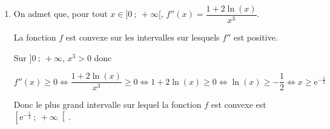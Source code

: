 \documentclass[10pt]{article}
\providecommand{\e}{{\mathrm{e}}}
\begin{document}
\begin{enumerate}
On dresse le tableau de variations de $f$ sur $]0~;~+\infty[$:

\begin{center}
{\renewcommand{\arraystretch}{1.3}
\def\esp{\hspace*{2.5cm}}
\def\hauteur{0pt}
$\begin{array}{|c|l *4{c}|}
\hline
x & 0  & \esp & \frac{1}{\e} & \esp & +\infty \\ 
\hline
f'(x) &\vline\;\vline  &   \pmb{+} & \vline\hspace{-2.7pt}0 & \pmb{-} & \\ 
\hline
 & \vline\;\vline &  &   \Rnode{max}{\e}  &  &   \\  
f(x) &\vline\;\vline &     &  &  &  \rule{0pt}{\hauteur} \\ 
 & \vline\;\vline \Rnode{min1}{~-\infty} &   &  &  &   \Rnode{min2}{0} \rule{0pt}{\hauteur}    
 \ncline{->}{min1}{max} 
 \ncline{->}{max}{min2} 
 \\ 
\hline
\end{array} $
}
\end{center}	

\item 
On admet que, pour tout $x\in]0~;~+\infty[$, $f''(x)=\dfrac{1+2\ln(x)}{x^3} $.



La fonction $f$ est convexe sur les intervalles sur lesquels $f''$ est positive.

Sur $]0~;~+\infty$, $x^3>0$ donc

$f''(x)\geqslant 0
\iff \dfrac{1+2\ln(x)}{x^3} \geqslant 0
\iff 1+2\ln(x) \geqslant 0
\iff \ln(x) \geqslant -\dfrac{1}{2}
\iff x\geqslant \e^{-\frac{1}{2}}$

Donc le plus grand intervalle sur lequel la fonction $f$ est convexe est $\left [\e^{-\frac{1}{2}}~;~+\infty \right [$.
\end{enumerate}
\end{document}
